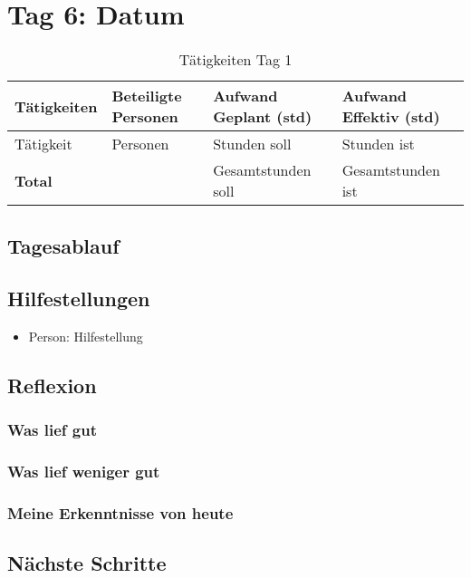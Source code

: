 \section{Tag 6: Datum}
\begin{table}[H]
    \begin{tabular}{|L{0.4\textwidth}|C{60pt}|C{60pt}|C{60pt}|}
        \hline
        \color{white}Tätigkeiten & \color{white}Beteiligte \color{white}Personen & \color{white}Aufwand Geplant (std) & \color{white}Aufwand Effektiv (std) \\
        \hline
         Tätigkeit & Personen & Stunden soll & Stunden ist \\
        \hline
        \textbf{Total} &  & Gesamtstunden soll & Gesamtstunden ist \\
        \hline
    \end{tabular}
    \caption{Tätigkeiten Tag 1}
\end{table}

\subsection*{Tagesablauf}

\subsection*{Hilfestellungen}
\begin{itemize}
    \item Person: Hilfestellung
\end{itemize}

\subsection*{Reflexion}

\subsubsection*{Was lief gut}

\subsubsection*{Was lief weniger gut}

\subsubsection*{Meine Erkenntnisse von heute}

\subsection*{Nächste Schritte}

\pagebreak
